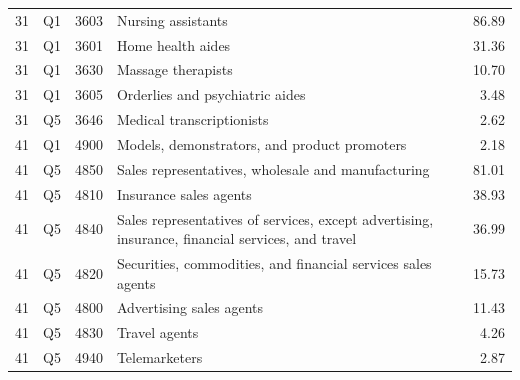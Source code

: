 \begin{center}
\begin{longtable}{@{}r c r p{} r@{}}
31 & Q1 & 3603 & Nursing assistants & 86.89 \\
31 & Q1 & 3601 & Home health aides & 31.36 \\
31 & Q1 & 3630 & Massage therapists & 10.70 \\
31 & Q1 & 3605 & Orderlies and psychiatric aides & 3.48 \\
31 & Q5 & 3646 & Medical transcriptionists & 2.62 \\
41 & Q1 & 4900 & Models, demonstrators, and product promoters & 2.18 \\
41 & Q5 & 4850 & Sales representatives, wholesale and manufacturing & 81.01 \\
41 & Q5 & 4810 & Insurance sales agents & 38.93 \\
41 & Q5 & 4840 & Sales representatives of services, except advertising, insurance, financial services, and travel & 36.99 \\
41 & Q5 & 4820 & Securities, commodities, and financial services sales agents & 15.73 \\
41 & Q5 & 4800 & Advertising sales agents & 11.43 \\
41 & Q5 & 4830 & Travel agents & 4.26 \\
41 & Q5 & 4940 & Telemarketers & 2.87 \\
\end{longtable}
\end{center}
